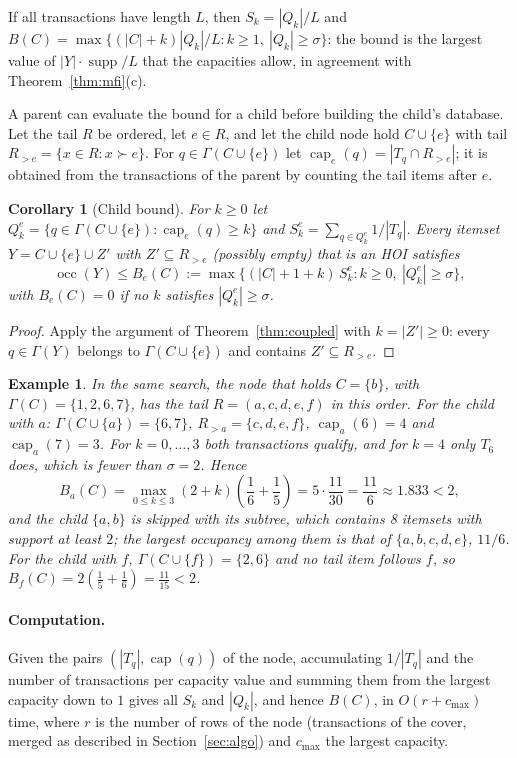 \documentclass[pdflatex,sn-mathphys,Numbered]{sn-jnl}
\theoremstyle{thmstyleone}
\newtheorem{corollary}[theorem]{Corollary}
\theoremstyle{thmstyletwo}
\newtheorem{example}{Example}
\theoremstyle{thmstylethree}
\newcommand{\supp}{\operatorname{supp}}
\newcommand{\occ}{\operatorname{occ}}
\newcommand{\capa}{\operatorname{cap}}
\begin{document}
If all transactions have length $L$, then $S_k = |Q_k| / L$ and $B(C) = \max \{ (|C| + k) |Q_k| / L : k \ge 1,\ |Q_k| \ge \sigma \}$: the bound is the largest value of $|Y| \cdot \supp / L$ that the capacities allow, in agreement with Theorem~\ref{thm:mfi}(c).

A parent can evaluate the bound for a child before building the child's database. Let the tail $R$ be ordered, let $e \in R$, and let the child node hold $C \cup \{e\}$ with tail $R_{>e} = \{ x \in R : x \succ e \}$. For $q \in \Gamma(C \cup \{e\})$ let $\capa_e(q) = |T_q \cap R_{>e}|$; it is obtained from the transactions of the parent by counting the tail items after $e$.

\begin{corollary}[Child bound]\label{cor:child}
For $k \ge 0$ let $Q^e_k = \{ q \in \Gamma(C \cup \{e\}) : \capa_e(q) \ge k \}$ and $S^e_k = \sum_{q \in Q^e_k} 1/|T_q|$. Every itemset $Y = C \cup \{e\} \cup Z'$ with $Z' \subseteq R_{>e}$ (possibly empty) that is an HOI satisfies
\[
\occ(Y) \le B_e(C) := \max \{ (|C| + 1 + k) \, S^e_k : k \ge 0,\ |Q^e_k| \ge \sigma \},
\]
with $B_e(C) = 0$ if no $k$ satisfies $|Q^e_k| \ge \sigma$.
\end{corollary}
\begin{proof}
Apply the argument of Theorem~\ref{thm:coupled} with $k = |Z'| \ge 0$: every $q \in \Gamma(Y)$ belongs to $\Gamma(C \cup \{e\})$ and contains $Z' \subseteq R_{>e}$.
\end{proof}

\begin{example}\label{ex:child}
In the same search, the node that holds $C = \{b\}$, with $\Gamma(C) = \{1, 2, 6, 7\}$, has the tail $R = (a, c, d, e, f)$ in this order. For the child with $a$: $\Gamma(C \cup \{a\}) = \{6, 7\}$, $R_{>a} = \{c, d, e, f\}$, $\capa_a(6) = 4$ and $\capa_a(7) = 3$. For $k = 0, \dots, 3$ both transactions qualify, and for $k = 4$ only $T_6$ does, which is fewer than $\sigma = 2$. Hence
\[
B_a(C) = \max_{0 \le k \le 3} (2 + k) \left(\frac16 + \frac15\right) = 5 \cdot \frac{11}{30} = \frac{11}{6} \approx 1.833 < 2,
\]
and the child $\{a,b\}$ is skipped with its subtree, which contains 8 itemsets with support at least $2$; the largest occupancy among them is that of $\{a,b,c,d,e\}$, $11/6$. For the child with $f$, $\Gamma(C \cup \{f\}) = \{2, 6\}$ and no tail item follows $f$, so $B_f(C) = 2 \left(\frac15 + \frac16\right) = \frac{11}{15} < 2$.
\end{example}

\paragraph{Computation.}
Given the pairs $(|T_q|, \capa(q))$ of the node, accumulating $1/|T_q|$ and the number of transactions per capacity value and summing them from the largest capacity down to $1$ gives all $S_k$ and $|Q_k|$, and hence $B(C)$, in $O(r + c_{\max})$ time, where $r$ is the number of rows of the node (transactions of the cover, merged as described in Section~\ref{sec:algo}) and $c_{\max}$ the largest capacity.
\end{document}
